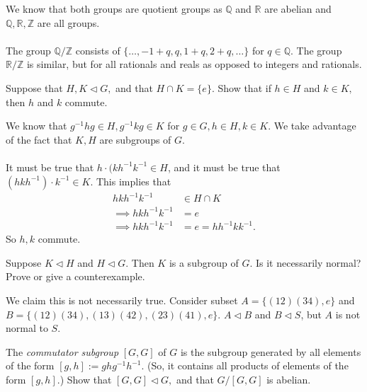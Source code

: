 \documentclass{scrartcl}
\begin{document}
\begin{soln}
    We know that both groups are quotient groups as $\mathbb{Q}$ and $\mathbb{R}$ are abelian and $\mathbb{Q}, \mathbb{R}, \mathbb{Z}$ are all groups. \\
    \\
    The group $\mathbb{Q} / \mathbb{Z}$ consists of $\{ \dotsc, -1 + q, q, 1 + q, 2 + q, \dotsc \}$ for $q \in \mathbb{Q}$. The group $\mathbb{R} / \mathbb{Z}$ is similar, but for all rationals and reals as opposed to integers and rationals.
\end{soln}

\begin{problem}[3]
    Suppose that $H,K\lhd G,$ and that $H\cap K=\{e\}.$ Show that if $h\in H$ and $k\in K,$ then $h$ and $k$ commute.
\end{problem}
\begin{soln}
    We know that $g^{-1}hg \in H, g^{-1}kg \in K$ for $g \in G, h \in H, k \in K$. We take advantage of the fact that $K, H$ are subgroups of $G$.\\
    \\
    It must be true that $h \cdot (kh^{-1}k^{-1} \in H$, and it must be true that $(hkh^{-1}) \cdot k^{-1} \in K$. This implies that 
    \begin{align*}
        hkh^{-1}k^{-1} &\in H \cap K \\
        \implies hkh^{-1}k^{-1} &= e \\
        \implies hkh^{-1}k^{-1} &= e = hh^{-1}kk^{-1}.
    \end{align*}
    So $h,k$ commute.
\end{soln}

\begin{problem}[5]
    Suppose $K \lhd H$ and $H \lhd G.$ Then $K$ is a subgroup of $G.$ Is it necessarily normal? Prove or give a counterexample.
\end{problem}

\begin{soln}
    We claim this is not necessarily true. Consider subset $A = \{ (12)(34), e \}$ and $B = \{(12)(34), (13)(42), (23)(41), e \}$. $A \lhd B$ and $B \lhd S$, but $A$ is not normal to $S$.
\end{soln}

\begin{problem}[6]
    The \textit{commutator subgroup} $[G, G]$ of $G$ is the subgroup generated by all elements of the form $[g, h] := ghg^{-1}h^{-1}.$ (So, it contains all products of elements of the form $[g, h].$) Show that $[G, G] \lhd G,$ and that $G/[G, G]$ is abelian.
\end{problem}
\end{document}
